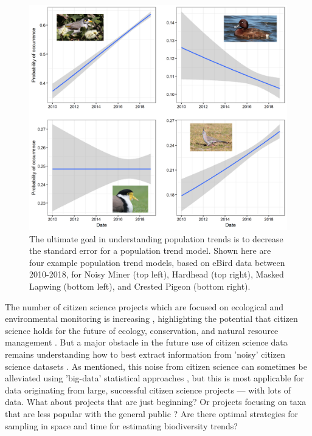 \documentclass[9pt,twocolumn,twoside,lineno]{pnas-new}
\begin{document}
\begin{figure}[!hb]
\centering
\includegraphics[width=.8\linewidth]{glm_examples_edited.png}
\caption{The ultimate goal in understanding population trends is to decrease the standard error for a population trend model. Shown here are four example population trend models, based on eBird data between 2010-2018, for Noisy Miner (top left), Hardhead (top right), Masked Lapwing (bottom left), and Crested Pigeon (bottom right).}
\label{fig1}
\end{figure}

The number of citizen science projects which are focused on ecological and environmental monitoring is increasing \cite{pocock2017diversity, theobald2015global}, highlighting the potential that citizen science holds for the future of ecology, conservation, and natural resource management \cite{pocock2018vision, silvertown2009new, soroye2018opportunistic, mckinley2017citizen}. But a major obstacle in the future use of citizen science data remains understanding how to best extract information from 'noisy' citizen science datasets \cite{parrish2018exposing}. As mentioned, this noise from citizen science \cite{bird2014statistical} can sometimes be alleviated using 'big-data' statistical approaches \cite{kelling2015taking}, but this is most applicable for data originating from large, successful citizen science projects --- with lots of data. What about projects that are just beginning? Or projects focusing on taxa that are less popular with the general public \cite{mair2016explaining, ward2014understanding}? Are there optimal strategies for sampling in space and time for estimating biodiversity trends?
\end{document}

